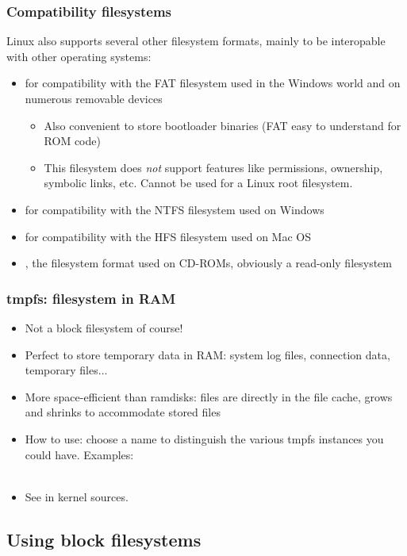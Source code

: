 \begin{frame}
  \frametitle{Compatibility filesystems}
  Linux also supports several other filesystem formats, mainly to be
  interopable with other operating systems:
  \begin{itemize}
  \item {} for compatibility with the FAT filesystem used in
    the Windows world and on numerous removable devices
    \begin{itemize}
    \item Also convenient to store bootloader binaries (FAT easy
      to understand for ROM code)
    \item This filesystem does {\em not} support features like
      permissions, ownership, symbolic links, etc. Cannot be used for
      a Linux root filesystem.
    \end{itemize}
  \item {} for compatibility with the NTFS filesystem used on
    Windows
  \item {} for compatibility with the HFS filesystem used on
    Mac OS
  \item {}, the filesystem format used on CD-ROMs,
    obviously a read-only filesystem
  \end{itemize}
\end{frame}

\begin{frame}
  \frametitle{tmpfs: filesystem in RAM}
  \begin{itemize}
  \item Not a block filesystem of course!
  \item Perfect to store temporary data in RAM: system log files,
    connection data, temporary files...
  \item More space-efficient than ramdisks: files are directly in the
    file cache, grows and shrinks to accommodate stored files
  \item How to use: choose a name to distinguish the various tmpfs
    instances you could have. Examples:\\
    \\
  \item  See  in kernel sources.
  \end{itemize}
\end{frame}

\subsection{Using block filesystems}

